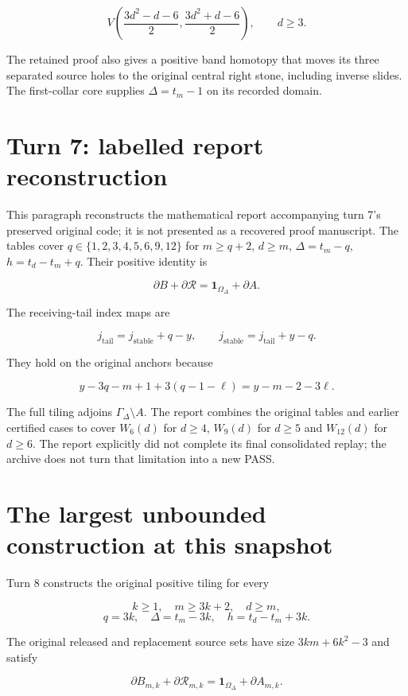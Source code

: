 \documentclass[
  10pt,
]{scrreprt}
\begin{document}
\[V\left(\frac{3d^2-d-6}{2},\frac{3d^2+d-6}{2}\right),\qquad d\ge3.\]

The retained proof also gives a positive band homotopy that moves its
three separated source holes to the original central right stone,
including inverse slides. The first-collar core supplies
\(\Delta=t_m-1\) on its recorded domain.

\section{Turn 7: labelled report
reconstruction}\label{turn-7-labelled-report-reconstruction}

This paragraph reconstructs the mathematical report accompanying turn
7's preserved original code; it is not presented as a recovered proof
manuscript. The tables cover \(q\in\{1,2,3,4,5,6,9,12\}\) for
\(m\ge q+2\), \(d\ge m\), \(\Delta=t_m-q\), \(h=t_d-t_m+q\). Their
positive identity is

\[\partial B+\partial\mathcal R=\mathbf1_{\Omega_\Delta}+\partial A.\]

The receiving-tail index maps are

\[j_{\mathrm{tail}}=j_{\mathrm{stable}}+q-y,\qquad j_{\mathrm{stable}}=j_{\mathrm{tail}}+y-q.\]

They hold on the original anchors because

\[y-3q-m+1+3(q-1-\ell)=y-m-2-3\ell.\]

The full tiling adjoins \(\Gamma_\Delta\setminus A\). The report
combines the original tables and earlier certified cases to cover
\(W_6(d)\) for \(d\ge4\), \(W_9(d)\) for \(d\ge5\) and \(W_{12}(d)\) for
\(d\ge6\). The report explicitly did not complete its final consolidated
replay; the archive does not turn that limitation into a new PASS.

\section{The largest unbounded construction at this
snapshot}\label{the-largest-unbounded-construction-at-this-snapshot}

Turn 8 constructs the original positive tiling for every

\[k\ge1,\quad m\ge3k+2,\quad d\ge m,\]
\[q=3k,\quad\Delta=t_m-3k,\quad h=t_d-t_m+3k.\]

The original released and replacement source sets have size
\(3km+6k^2-3\) and satisfy

\[\partial B_{m,k}+\partial\mathcal R_{m,k}
=\mathbf1_{\Omega_\Delta}+\partial A_{m,k}.\]
\end{document}
